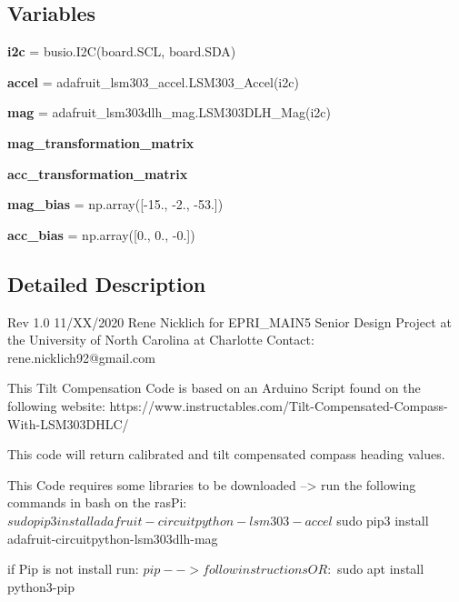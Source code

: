 \subsection*{Variables}
\begin{DoxyCompactItemize}
\item 
\mbox{\label{namespaceLSM303DLHC__tc_af1fd802de9957719aac5345aec8098d8}} 
{\bfseries i2c} = busio.\+I2C(board.\+S\+CL, board.\+S\+DA)
\item 
\mbox{\label{namespaceLSM303DLHC__tc_a09069f01b960a0147af6cf2b23e2a18a}} 
{\bfseries accel} = adafruit\+\_\+lsm303\+\_\+accel.\+L\+S\+M303\+\_\+\+Accel(i2c)
\item 
\mbox{\label{namespaceLSM303DLHC__tc_a6e0cf9513a377bbf9780416130e11637}} 
{\bfseries mag} = adafruit\+\_\+lsm303dlh\+\_\+mag.\+L\+S\+M303\+D\+L\+H\+\_\+\+Mag(i2c)
\item 
{\bfseries mag\+\_\+transformation\+\_\+matrix}
\item 
{\bfseries acc\+\_\+transformation\+\_\+matrix}
\item 
\mbox{\label{namespaceLSM303DLHC__tc_a8f4c06d11145d97157ca8db519a28fa5}} 
{\bfseries mag\+\_\+bias} = np.\+array(\mbox{[}-\/15., -\/2., -\/53.\mbox{]})
\item 
\mbox{\label{namespaceLSM303DLHC__tc_ad6dafd853e3349f2727c43376236b25e}} 
{\bfseries acc\+\_\+bias} = np.\+array(\mbox{[}0., 0., -\/0.\mbox{]})
\end{DoxyCompactItemize}


\subsection{Detailed Description}
\begin{DoxyVerb}Rev 1.0 
11/XX/2020
Rene Nicklich for EPRI_MAIN5 Senior Design Project at the University of North Carolina at Charlotte
Contact: rene.nicklich92@gmail.com

This Tilt Compensation Code is based on an Arduino Script found on the following website:
https://www.instructables.com/Tilt-Compensated-Compass-With-LSM303DHLC/

This code will return calibrated and tilt compensated compass heading values.

This Code requires some libraries to be downloaded -->  run the following commands in bash on the rasPi:
$ sudo pip3 install adafruit-circuitpython-lsm303-accel
$ sudo pip3 install adafruit-circuitpython-lsm303dlh-mag

if Pip is not install run:
$ pip
--> follow instructions
OR:
$ sudo apt install python3-pip
\end{DoxyVerb}
 

